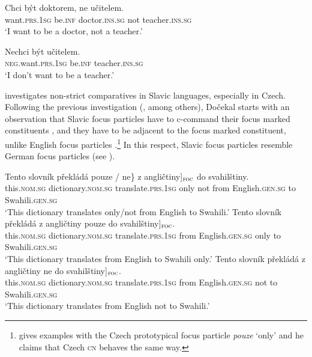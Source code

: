 \documentclass[output=paper,
]{langscibook}
\begin{document}
\ea 
\gll Chci být doktorem, ne učitelem.\\
want.\textsc{prs.1sg} be.\textsc{inf} doctor.\textsc{ins.sg} not teacher.\textsc{ins.sg}\\
\glt `I want to be a doctor, not a teacher.' \label{ex:cz_cn}
\z

\ea 
\gll Nechci být učitelem.\\
\textsc{neg}.want.\textsc{prs.1sg} be.\textsc{inf} teacher.\textsc{ins.sg}\\
\glt `I don't want to be a teacher.' \label{ex:cz_vn}
\z


\noindent \cite{dovcekal2017upper} investigates non-strict comparatives in Slavic languages, especially in Czech. Following the previous investigation (\citealt{jasinskaja2016information}, among others), Dočekal starts with an observation that Slavic focus particles have to c-command their focus marked constituents , and they have to be adjacent to the focus marked constituent, unlike English focus particles .\footnote{\cite{dovcekal2017upper} gives examples with the Czech prototypical focus particle \textit{pouze} `only' and he claims that Czech \textsc{cn} behaves the same way.} In this respect, Slavic focus particles resemble German focus particles (see \citealt{buring2001v3}). 

\ea \label{ex:only_c}
 \ea \gll Tento slovník překládá \minsp{\{} pouze / ne\} \minsp{[} z angličtiny]$_{\textsc{foc}}$ do svahilštiny.\\
    this.\textsc{nom.sg} dictionary.\textsc{nom.sg} translate.\textsc{prs.1sg} {} only {} not {} from English.\textsc{gen.sg} to Swahili.\textsc{gen.sg}\\
    \glt `This dictionary translates only/not from English to Swahili.'
\ex 
    \gll Tento slovník překládá z angličtiny pouze \minsp{[} do svahilštiny]$_{\textsc{foc}}$.\\
    this.\textsc{nom.sg} dictionary.\textsc{nom.sg} translate.\textsc{prs.1sg} from English.\textsc{gen.sg} only {} to Swahili.\textsc{gen.sg}\\
    \glt `This dictionary translates from English to Swahili only.' \label{ex:only_c_2}
\ex 
    \gll Tento slovník překládá z angličtiny ne \minsp{[} do svahilštiny]$_{\textsc{foc}}$.\\
    this.\textsc{nom.sg} dictionary.\textsc{nom.sg} translate.\textsc{prs.1sg} from English.\textsc{gen.sg} not {} to Swahili.\textsc{gen.sg}\\
    \glt `This dictionary translates from English not to Swahili.' \label{ex:only_c_3}
\z
\z
\end{document}

